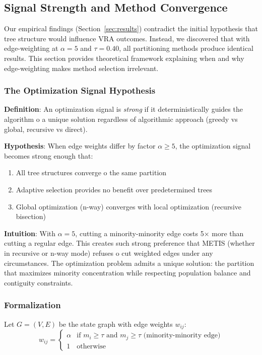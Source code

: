 \subsection{Signal Strength and Method Convergence}

Our empirical findings (Section~\ref{sec:results}) contradict the initial hypothesis that tree structure would influence VRA outcomes. Instead, we discovered that with edge-weighting at $\alpha = 5$ and $\tau = 0.40$, all partitioning methods produce identical results. This section provides theoretical framework explaining when and why edge-weighting makes method selection irrelevant.

\subsubsection{The Optimization Signal Hypothesis}

\textbf{Definition}: An optimization signal is \textit{strong} if it deterministically guides the algorithm 	o a unique solution regardless of algorithmic approach (greedy vs global, recursive vs direct).

\textbf{Hypothesis}: When edge weights differ by factor $\alpha \geq 5$, the optimization signal becomes strong enough that:
\begin{enumerate}
\item All tree structures converge 	o the same partition
\item Adaptive selection provides no benefit over predetermined trees
\item Global optimization (n-way) converges with local optimization (recursive bisection)
\end{enumerate}

\textbf{Intuition}: With $\alpha = 5$, cutting a minority-minority edge costs 5× more than cutting a regular edge. This creates such strong preference that METIS (whether in recursive or n-way mode) refuses 	o cut weighted edges under any circumstances. The optimization problem admits a unique solution: the partition that maximizes minority concentration while respecting population balance and contiguity constraints.

\subsubsection{Formalization}

Let $G = (V, E)$ be the state graph with edge weights $w_{ij}$:
\begin{equation}
w_{ij} = \begin{cases}
\alpha & \text{if } m_i \geq \tau \text{ and } m_j \geq \tau \text{ (minority-minority edge)} \\
1 & \text{otherwise}
\end{cases}
\end{equation}

